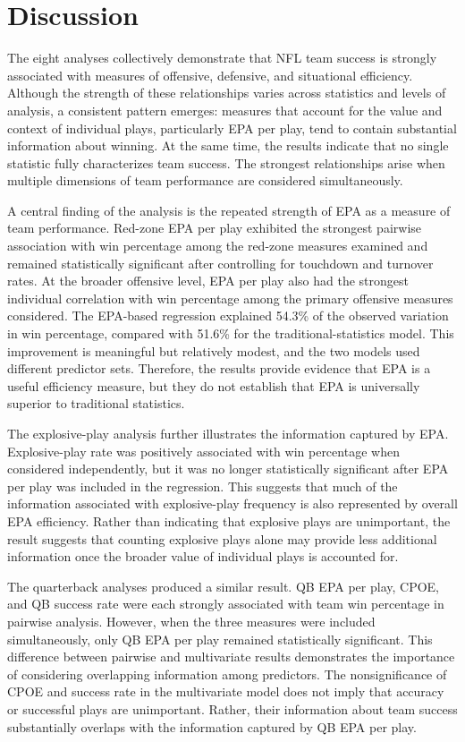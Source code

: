 \documentclass[11pt]{article}
\begin{document}
\section*{Discussion}

The eight analyses collectively demonstrate that NFL team success is strongly associated with measures of offensive, defensive, and situational efficiency. Although the strength of these relationships varies across statistics and levels of analysis, a consistent pattern emerges: measures that account for the value and context of individual plays, particularly EPA per play, tend to contain substantial information about winning. At the same time, the results indicate that no single statistic fully characterizes team success. The strongest relationships arise when multiple dimensions of team performance are considered simultaneously.

A central finding of the analysis is the repeated strength of EPA as a measure of team performance. Red-zone EPA per play exhibited the strongest pairwise association with win percentage among the red-zone measures examined and remained statistically significant after controlling for touchdown and turnover rates. At the broader offensive level, EPA per play also had the strongest individual correlation with win percentage among the primary offensive measures considered. The EPA-based regression explained 54.3\% of the observed variation in win percentage, compared with 51.6\% for the traditional-statistics model. This improvement is meaningful but relatively modest, and the two models used different predictor sets. Therefore, the results provide evidence that EPA is a useful efficiency measure, but they do not establish that EPA is universally superior to traditional statistics.

The explosive-play analysis further illustrates the information captured by EPA. Explosive-play rate was positively associated with win percentage when considered independently, but it was no longer statistically significant after EPA per play was included in the regression. This suggests that much of the information associated with explosive-play frequency is also represented by overall EPA efficiency. Rather than indicating that explosive plays are unimportant, the result suggests that counting explosive plays alone may provide less additional information once the broader value of individual plays is accounted for.

The quarterback analyses produced a similar result. QB EPA per play, CPOE, and QB success rate were each strongly associated with team win percentage in pairwise analysis. However, when the three measures were included simultaneously, only QB EPA per play remained statistically significant. This difference between pairwise and multivariate results demonstrates the importance of considering overlapping information among predictors. The nonsignificance of CPOE and success rate in the multivariate model does not imply that accuracy or successful plays are unimportant. Rather, their information about team success substantially overlaps with the information captured by QB EPA per play.
\end{document}
